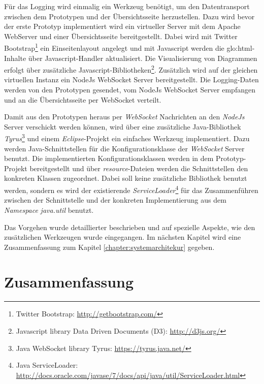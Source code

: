 Für das Logging wird einmalig ein Werkzeug benötigt, um den Datentransport zwischen dem Prototypen und der Übersichtsseite herzustellen. Dazu wird bevor der erste Prototyp implementiert wird ein virtueller Server mit dem Apache WebServer und einer Übersichtsseite bereitgestellt. Dabei wird mit Twitter Bootstrap\footnote{Twitter Bootstrap: \url{http://getbootstrap.com/}} ein Einseitenlayout angelegt und mit Javascript werden die \gls{glo:html}-Inhalte über Javascript-Handler aktualisiert. Die Visualisierung von Diagrammen erfolgt über zusätzliche Javascript-Bibliotheken\footnote{Javascript library Data Driven Documents (D3): \url{http://d3js.org/}}. Zusätzlich wird auf der gleichen virtuellen Instanz ein NodeJs WebSocket Server bereitgestellt. Die Logging-Daten werden von den Prototypen gesendet, vom NodeJs WebSocket Server empfangen und an die Übersichtsseite per WebSocket verteilt.

Damit aus den Prototypen heraus per \textit{WebSocket} Nachrichten an den \textit{NodeJs} Server verschickt werden können, wird über eine zusätzliche Java-Bibliothek \textit{Tyrus}\footnote{Java WebSocket library Tyrus: \url{https://tyrus.java.net/}} und einem \textit{Eclipse}-Projekt ein einfaches Werkzeug implementiert. Dazu werden Java-Schnittstellen für die Konfigurationsklasse der \textit{WebSocket} Server benutzt. Die implementierten Konfigurationsklassen werden in dem Prototyp-Projekt bereitgestellt und über \textit{resource}-Dateien werden die Schnittstellen den konkreten Klassen zugeordnet. Dabei soll keine zusätzliche Bibliothek benutzt werden, sondern es wird der existierende \textit{ServiceLoader}\footnote{Java ServiceLoader: \url{http://docs.oracle.com/javase/7/docs/api/java/util/ServiceLoader.html}} für das Zusammenführen zwischen der Schnittstelle und der konkreten Implementierung aus dem \textit{Namespace} \textit{java.util} benutzt.

Das Vorgehen wurde detaillierter beschrieben und auf spezielle Aspekte, wie den zusätzlichen Werkzeugen wurde eingegangen. Im nächsten Kapitel wird eine Zusammenfassung zum Kapitel \ref{chapter:systemarchitekur} gegeben.


\section{Zusammenfassung}

